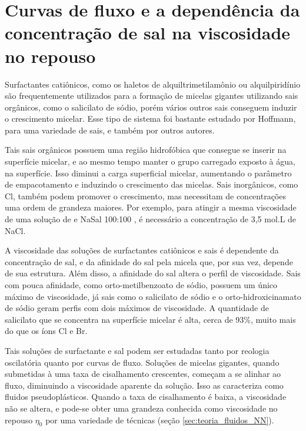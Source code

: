 		
		\section{Curvas de fluxo e a dependência da concentração de sal na viscosidade no repouso}    
			
		Surfactantes catiônicos, como os haletos de alquiltrimetilamônio ou alquilpiridínio são frequentemente utilizados para a formação de micelas gigantes utilizando sais orgânicos, como o salicilato de sódio, porém vários outros sais conseguem induzir o crescimento micelar. Esse tipo de sistema foi bastante estudado por Hoffmann, para uma variedade de sais, e também por outros autores. %
		
		Tais sais orgânicos possuem uma região hidrofóbica que consegue se inserir na superfície micelar, e ao mesmo tempo manter o grupo carregado exposto à água, na superfície. Isso diminui a carga superficial micelar, aumentando o parâmetro de empacotamento e induzindo o crescimento das micelas. Sais inorgânicos, como Cl\menosUm{}, também podem promover o crescimento, mas necessitam de concentrações uma ordem de grandeza maiores. Por exemplo, para atingir a mesma viscosidade de uma solução de \CTAB{} e NaSal 100:100 \mM, é necessário a concentração de 3,5 mol.L\menosUm{} de NaCl. %
		
		A viscosidade das soluções de surfactantes catiônicos e sais é dependente da concentração de sal, e da afinidade do sal pela micela que, por sua vez, depende de sua estrutura. Além disso, a afinidade do sal altera o perfil de viscosidade. Sais com pouca afinidade, como orto-metilbenzoato de sódio, possuem um único máximo de viscosidade, já sais como o salicilato de sódio e o orto-hidroxicinamato de sódio geram perfis com dois máximos de viscosidade. %
		A quantidade de salicilato que se concentra na superfície micelar é alta, cerca de 93\%, muito mais do que os íons Cl\menosUm{} e Br\menosUm{}. %
		
		Tais soluções de surfactante e sal podem ser estudadas tanto por reologia oscilatória quanto por curvas de fluxo. Soluções de micelas gigantes, quando submetidas à uma taxa de cisalhamento crescentes, começam a se alinhar ao fluxo, diminuindo a viscosidade aparente da solução. Isso as caracteriza como fluidos pseudoplásticos. Quando a taxa de cisalhamento é baixa, a viscosidade não se altera, e pode-se obter uma grandeza conhecida como viscosidade no repouso \(\eta_0\) por uma variedade de técnicas (seção \ref{sec:teoria_fluidos_NN}). 
		
